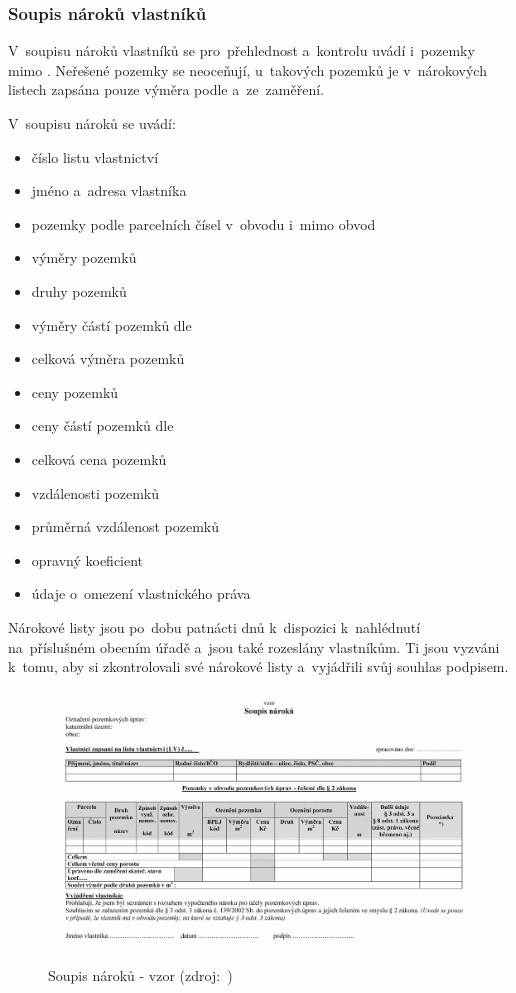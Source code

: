 \subsubsection{Soupis nároků vlastníků}
\label{soupis_naroku_vlastniku}

V~soupisu nároků vlastníků se pro~přehlednost a~kontrolu uvádí i~pozemky mimo . Neřešené pozemky se neoceňují, u~takových pozemků je v~nárokových listech zapsána pouze výměra podle  a~ze~zaměření.

V~soupisu nároků se uvádí:
\vspace{-\topsep}
	\begin{itemize}[leftmargin=1.5cm, noitemsep]
		\item číslo listu vlastnictví
		\item jméno a~adresa vlastníka
		\item pozemky podle parcelních čísel v~obvodu i~mimo obvod 
		\item výměry pozemků
		\item druhy pozemků
		\item výměry částí pozemků dle 
		\item celková výměra pozemků
		\item ceny pozemků
		\item ceny částí pozemků dle 
		\item celková cena pozemků
		\item vzdálenosti pozemků
		\item průměrná vzdálenost pozemků
		\item opravný koeficient
		\item údaje o~omezení vlastnického práva
	\end{itemize}

Nárokové listy jsou po~dobu patnácti dnů k~dispozici k~nahlédnutí na~příslušném obecním úřadě a~jsou také rozeslány vlastníkům. Ti jsou vyzváni k~tomu, aby si zkontrolovali své nárokové listy a~vyjádřili svůj souhlas podpisem.
 	
	\begin{figure}[H]
		\centering
		\includegraphics[width=.9\textwidth]{./pictures/soupis_naroku.png}
		\caption[Soupis nároků - vzor]{Soupis nároků - vzor (zdroj:~\citep{vyhlaska_13})}
		\label{fig:soupis_naroku}
 	\end{figure}

